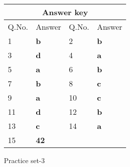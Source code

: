 \setlength\arrayrulewidth{1pt}
\begin{table}[H]
	\centering
	\begin{tabular}{|p{1.5cm}|p{1.5cm}||p{1.5cm}|p{1.5cm}|}
		\hline
		\multicolumn{4}{|c|}{\textbf{Answer key}}\\\hline\hline
		\rowcolor{ocrel}Q.No.&Answer&Q.No.&Answer\\\hline
		1&\textbf{b} &2&\textbf{b}\\\hline 
		3&\textbf{d} &4&\textbf{a} \\\hline
		5&\textbf{a} &6&\textbf{b} \\\hline
		7&\textbf{b}&8&\textbf{c}\\\hline
		9&\textbf{a}&10&\textbf{c}\\\hline
		11&\textbf{d} &12&\textbf{b}\\\hline
		13&\textbf{c}&14&\textbf{a}\\\hline
		15&\textbf{42}& &\\\hline
		
	\end{tabular}
\end{table}
\newpage
\begin{abox}
	Practice set-3
\end{abox}
